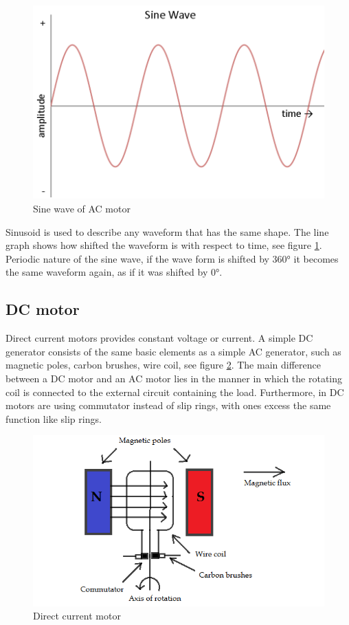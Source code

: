 \begin{figure}[h]
    \centering
    \includegraphics[width=.7\textwidth]{figures/wave.png}
    \caption{Sine wave of AC motor \cite{ACmotor3}} 
    \label{fig:ACmotor1} 
\end{figure}

Sinusoid is used to describe any waveform that has the same shape. The line graph shows how shifted the waveform is with respect to time, see figure \ref{fig:ACmotor1}. Periodic nature of the sine wave, if the wave form is shifted by 360° it becomes the same waveform again, as if it was shifted by 0°. 

\subsection{DC motor}
 Direct current motors provides constant voltage or current. A simple DC generator consists of the same basic elements as a simple AC generator, such as magnetic poles, carbon brushes, wire coil, see figure \ref{fig:DCmotor}. The main difference between a DC motor and an AC motor lies in the manner in which the rotating coil is connected to the external circuit containing the load. Furthermore, in DC motors  are using commutator instead of slip rings, with ones excess the same function like slip rings. 
 
 \begin{figure}[h]
    \centering
    \includegraphics[width=.7\textwidth]{figures/Directcurrent(DC).png}
    \caption{Direct current motor } 
    \label{fig:DCmotor} 
\end{figure}


